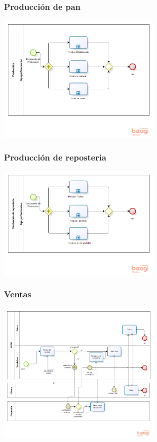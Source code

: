 \documentclass[10pt,letterpaper]{beamer}
\begin{document}
\begin{frame}
\frametitle{Producción de pan}
\begin{center}
\includegraphics[width=8cm]{./imagenes/produccion_pan.png}
\end{center}
\end{frame}

\begin{frame}
\frametitle{Producción de reposteria}
\begin{center}
\includegraphics[width=8cm]{./imagenes/produccion_reposteria.png}
\end{center}
\end{frame}

\begin{frame}
\frametitle{Ventas}
\begin{center}
\includegraphics[width=8cm]{./imagenes/ventas.png}
\end{center}
\end{frame}
\end{document}

